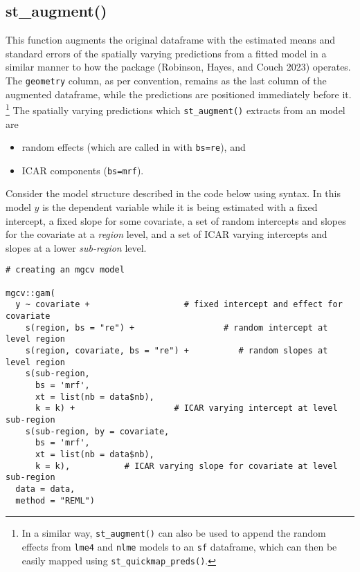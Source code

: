 \hypertarget{st_augment}{%
\subsection{st\_augment()}\label{st_augment}}

This function augments the original dataframe with the estimated means
and standard errors of the spatially varying predictions from a fitted  model in a similar manner to
how the  package (Robinson, Hayes, and Couch 2023) operates. The \texttt{geometry} column, as per convention, remains as the last column of the augmented dataframe, while the predictions are positioned immediately before it. \footnote{In a similar way, \texttt{st\_augment()} can also be used to append the random effects from \texttt{lme4} and \texttt{nlme} models to an \texttt{sf} dataframe, which can then be easily mapped using \texttt{st\_quickmap\_preds()}.} The spatially varying predictions which \texttt{st\_augment()} extracts from an  model are

\begin{itemize}
\tightlist
\item
  random effects (which are called in  with \texttt{bs=\textquotesingle{}re\textquotesingle{}}), and
\item
  ICAR components (\texttt{bs=\textquotesingle{}mrf\textquotesingle{}}).
\end{itemize}

Consider the model structure described in the code below using  syntax. In this model \(y\) is the dependent variable while it is being estimated with a fixed intercept, a fixed slope for some covariate, a set of random intercepts and slopes for the covariate at a \emph{region} level, and a set of ICAR varying intercepts and slopes at a lower \emph{sub-region} level.

\begin{verbatim}
# creating an mgcv model

mgcv::gam(
  y ~ covariate +                   # fixed intercept and effect for covariate  
    s(region, bs = "re") +                  # random intercept at level region
    s(region, covariate, bs = "re") +          # random slopes at level region
    s(sub-region, 
      bs = 'mrf',
      xt = list(nb = data$nb), 
      k = k) +                    # ICAR varying intercept at level sub-region
    s(sub-region, by = covariate, 
      bs = 'mrf',
      xt = list(nb = data$nb), 
      k = k),           # ICAR varying slope for covariate at level sub-region
  data = data, 
  method = "REML")
\end{verbatim}

